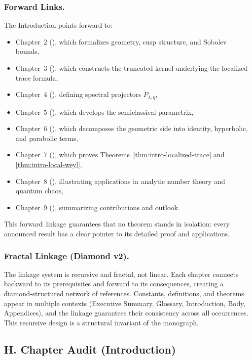 \subsubsection*{Forward Links.}
The Introduction points forward to:
\begin{itemize}
  \item Chapter~2 (), which formalizes geometry, cusp structure, and Sobolev bounds,
  \item Chapter~3 (), which constructs the truncated kernel underlying the localized trace formula,
  \item Chapter~4 (), defining spectral projectors $P_{\lambda,\eta}$,
  \item Chapter~5 (), which develops the semiclassical parametrix,
  \item Chapter~6 (), which decomposes the geometric side into identity, hyperbolic, and parabolic terms,
  \item Chapter~7 (), which proves Theorems~\ref{thm:intro-localized-trace} and \ref{thm:intro-local-weyl},
  \item Chapter~8 (), illustrating applications in analytic number theory and quantum chaos,
  \item Chapter~9 (), summarizing contributions and outlook.
\end{itemize}
This forward linkage guarantees that no theorem stands in isolation:
every announced result has a clear pointer to its detailed proof and applications.

\subsubsection*{Fractal Linkage (Diamond v2).}
The linkage system is recursive and fractal, not linear.
Each chapter connects backward to its prerequisites and forward to its consequences,
creating a diamond-structured network of references.
Constants, definitions, and theorems appear in multiple contexts
(Executive Summary, Glossary, Introduction, Body, Appendices),
and the linkage guarantees their consistency across all occurrences.
This recursive design is a structural invariant of the monograph.

\subsection*{H. Chapter Audit (Introduction)}

